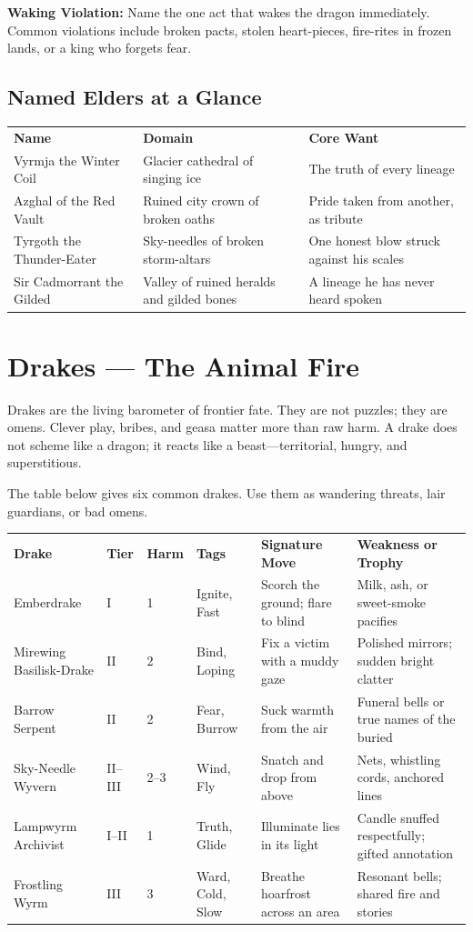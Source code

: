 \medskip
\noindent
\textbf{Waking Violation:} Name the one act that wakes the dragon immediately. Common violations include broken pacts, stolen heart-pieces, fire-rites in frozen lands, or a king who forgets fear.

\subsection*{Named Elders at a Glance}

\begin{tabular}{p{1.6in}p{2.2in}p{2.4in}}
  \textbf{Name} & \textbf{Domain} & \textbf{Core Want} \\
  Vyrmja the Winter Coil & Glacier cathedral of singing ice & The truth of every lineage \\
  Azghal of the Red Vault & Ruined city crown of broken oaths & Pride taken from another, as tribute \\
  Tyrgoth the Thunder-Eater & Sky-needles of broken storm-altars & One honest blow struck against his scales \\
  Sir Cadmorrant the Gilded & Valley of ruined heralds and gilded bones & A lineage he has never heard spoken
\end{tabular}

\section{Drakes --- The Animal Fire}

Drakes are the living barometer of frontier fate. They are not puzzles; they are omens. Clever play, bribes, and geasa matter more than raw harm. A drake does not scheme like a dragon; it reacts like a beast---territorial, hungry, and superstitious.

The table below gives six common drakes. Use them as wandering threats, lair guardians, or bad omens.

\begin{tabular}{p{1.3in}p{0.5in}p{0.6in}p{1.5in}p{1.8in}p{1.2in}}
  \textbf{Drake} & \textbf{Tier} & \textbf{Harm} & \textbf{Tags} & \textbf{Signature Move} & \textbf{Weakness or Trophy} \\
  Emberdrake & I & 1 & Ignite, Fast & Scorch the ground; flare to blind & Milk, ash, or sweet-smoke pacifies \\
  Mirewing Basilisk-Drake & II & 2 & Bind, Loping & Fix a victim with a muddy gaze & Polished mirrors; sudden bright clatter \\
  Barrow Serpent & II & 2 & Fear, Burrow & Suck warmth from the air & Funeral bells or true names of the buried \\
  Sky-Needle Wyvern & II--III & 2--3 & Wind, Fly & Snatch and drop from above & Nets, whistling cords, anchored lines \\
  Lampwyrm Archivist & I--II & 1 & Truth, Glide & Illuminate lies in its light & Candle snuffed respectfully; gifted annotation \\
  Frostling Wyrm & III & 3 & Ward, Cold, Slow & Breathe hoarfrost across an area & Resonant bells; shared fire and stories
\end{tabular}

